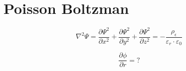 \section{Poisson Boltzman}
\[\nabla^{2}\Psi=\frac{\partial \Psi^2}{\partial x^2}+\frac{\partial \Psi^2}{\partial y^2}+\frac{\partial \Psi^2}{\partial z^2}=-\frac{\rho_{\epsilon}}{\varepsilon_{r}\cdot\varepsilon_{0}}\]

\[\frac{\partial \phi}{\partial r}=?\]